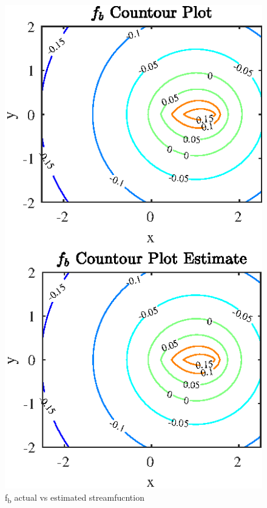 \begin{figure}[htbp]
\centering
\includegraphics[scale=1.55]{graphs/e2g2.eps}
\caption{f\textsubscript{b} actual vs estimated streamfucntion}
\label{Exercise 2}
\end{figure}